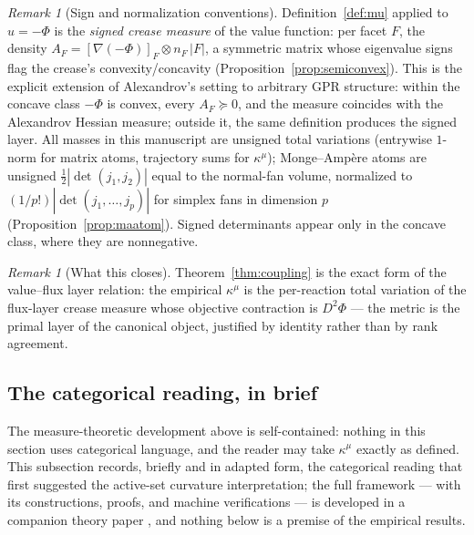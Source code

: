 \documentclass[11pt,a4paper]{article}
\theoremstyle{plain}
\theoremstyle{definition}
\theoremstyle{remark}
\newtheorem{remark}[theorem]{Remark}
\newcommand{\kmu}{\kappa^{\mu}}
\begin{document}
\begin{remark}[Sign and normalization conventions]\label{rem:conventions}
Definition~\ref{def:mu} applied to $u = -\Phi$ is the \emph{signed
crease measure} of the value function: per facet $F$, the density
$A_F = [\nabla(-\Phi)]_F \otimes n_F\,|F|$, a symmetric matrix whose
eigenvalue signs flag the crease's convexity/concavity
(Proposition~\ref{prop:semiconvex}). This is the explicit extension
of Alexandrov's setting to arbitrary GPR structure: within the
concave class $-\Phi$ is convex, every $A_F \succeq 0$, and the
measure coincides with the Alexandrov Hessian measure; outside it,
the same definition produces the signed layer. All masses in this
manuscript are unsigned total variations (entrywise $1$-norm for
matrix atoms, trajectory sums for $\kmu$); Monge--Amp\`ere atoms are
unsigned $\tfrac12|\det(j_1, j_2)|$ equal to the normal-fan volume,
normalized to $(1/p!)|\det(j_1,\dots,j_p)|$ for simplex fans in
dimension $p$ (Proposition~\ref{prop:maatom}). Signed determinants
appear only in the concave class, where they are nonnegative.
\end{remark}

\begin{remark}[What this closes]\label{rem:closes}
Theorem~\ref{thm:coupling} is the exact form of the value--flux layer relation: the empirical $\kmu$ is the
per-reaction total variation of the flux-layer crease measure whose
objective contraction is $D^2\Phi$ --- the metric is the primal
layer of the canonical object, justified by identity rather than by
rank agreement.
\end{remark}

\subsection{The categorical reading, in brief}\label{sec:categorical}

The measure-theoretic development above is self-contained: nothing in
this section uses categorical language, and the reader may take
$\kmu$ exactly as defined. This subsection records, briefly and in
adapted form, the categorical reading that first suggested the
active-set curvature interpretation; the full framework --- with its
constructions, proofs, and machine verifications --- is developed in
a companion theory paper \citep{zai2026categorical}, and nothing
below is a premise of the empirical results.
\end{document}
